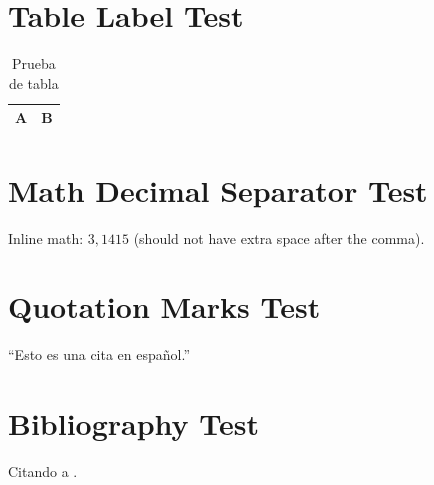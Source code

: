 \documentclass[a4paper,11pt]{article}
\begin{document}
\section{Table Label Test}
\begin{table}[h]
\centering
\begin{tabular}{|c|c|}
\hline
A & B \\
\hline
\end{tabular}
\caption{Prueba de tabla}
\end{table}

\section{Math Decimal Separator Test}
Inline math: $3,1415$ (should not have extra space after the comma).

\section{Quotation Marks Test}
\enquote{Esto es una cita en español.}

\section{Bibliography Test}
Citando a \cite{sample}.

\printbibliography
\end{document}
